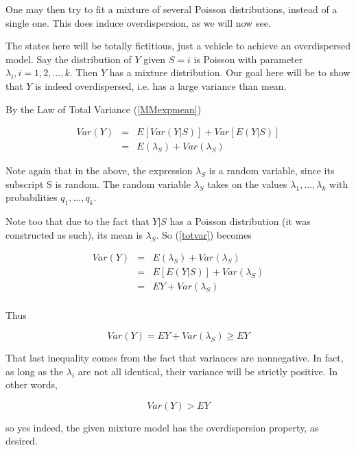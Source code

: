 \documentclass[11pt]{article}
\begin{document}
One may then try to fit a mixture of several Poisson distributions,
instead of a single one.  This does induce overdispersion, as we will
now see.  

The states here will be totally fictitious, just a vehicle to achieve an
overdispersed model.  Say the distribution of $Y$ given $S = i$ is
Poisson with parameter $\lambda_i, i = 1,2,...,k$.  Then $Y$ has a
mixture distribution.  Our goal here will be to show that $Y$ is indeed
overdispersed, i.e. has a large variance than mean.

By the Law of Total Variance (\ref{MMexpmean})

\begin{eqnarray}
Var(Y) &=& E[Var(Y|S)] + Var[E(Y|S)] \\ 
&=& E(\lambda_S) + Var(\lambda_S) \label{totvar}
\end{eqnarray}

Note again that in the above, the expression $\lambda_S$ is a random
variable, since its subscript S is random.  The random variable
$\lambda_S$ takes on the values $\lambda_1,...,\lambda_k$ with
probabilities $q_1,...,q_k$.

Note too that due to the fact that $Y|S$ has a Poisson distribution (it
was constructed as such), its mean is $\lambda_S$.  So (\ref{totvar})
becomes

\begin{eqnarray}
Var(Y) &=& E(\lambda_S) + Var(\lambda_S) \\
&=& E[E(Y|S)] + Var(\lambda_S) \\
&=& EY + Var(\lambda_S) \\
\end{eqnarray}

Thus

\begin{equation}
Var(Y) = EY + Var(\lambda_S) \label{thislast}  \geq EY
\end{equation}

That last inequality comes from the fact that variances are nonnegative.
In fact, as long as the $\lambda_i$ are not all identical, their
variance will be strictly positive.  In other words,

\begin{equation}
Var(Y) >  EY
\end{equation}

so yes indeed, the given mixture model has the 
overdispersion property, as desired.
\end{document}
